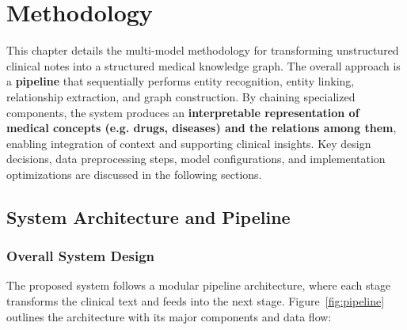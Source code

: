 
\chapter{Methodology} %

\label{Chapter3} %


This chapter details the multi-model methodology for transforming unstructured clinical notes into a structured medical knowledge graph. The overall approach is a \textbf{pipeline} that sequentially performs entity recognition, entity linking, relationship extraction, and graph construction. By chaining specialized components, the system produces an \textbf{interpretable representation of medical concepts (e.g. drugs, diseases) and the relations among them}, enabling integration of context and supporting clinical insights. Key design decisions, data preprocessing steps, model configurations, and implementation optimizations are discussed in the following sections.

\section{System Architecture and Pipeline}

\subsection{Overall System Design}

The proposed system follows a modular pipeline architecture, where each stage transforms the clinical text and feeds into the next stage. Figure~\ref{fig:pipeline} outlines the architecture with its major components and data flow:

